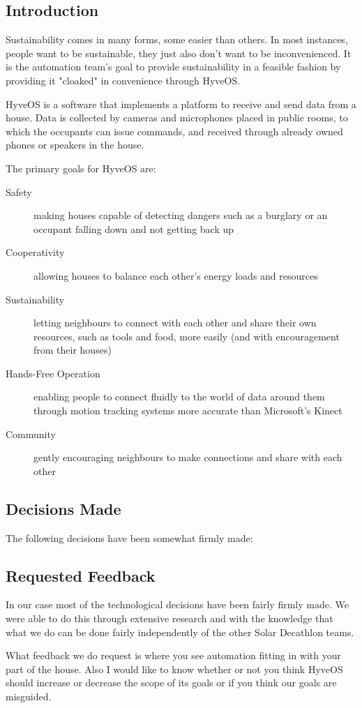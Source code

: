 \begin{multicols}{2}

\section{Introduction}

	Sustainability comes in many forms, some easier than others.
	In most instances, people want to be sustainable, they just also don't want to be inconvenienced.
	It is the automation team's goal to provide sustainability in a feasible fashion by providing it "cloaked" in convenience through HyveOS.
	
	HyveOS is a software that implements a platform to receive and send data from a house. 
	Data is collected by cameras and microphones placed in public rooms, to which the occupants can issue commands, and received through already owned phones or speakers in the house.
	
	The primary goals for HyveOS are:
	\begin{description}
		\item[Safety] making houses capable of detecting dangers such as a burglary or an occupant falling down and not getting back up
		\item[Cooperativity] allowing houses to balance each other's energy loads and resources
		\item[Sustainability] letting neighbours to connect with each other and share their own resources, such as tools and food, more easily (and with encouragement from their houses)
		\item[Hands-Free Operation] enabling people to connect fluidly to the world of data around them through motion tracking systems more accurate than Microsoft's Kinect
		\item[Community] gently encouraging neighbours to make connections and share with each other
	\end{description}

	\subsection{Decisions Made}
	
		The following decisions have been somewhat firmly made:
		
	\subsection{Requested Feedback}
	
		In our case most of the technological decisions have been fairly firmly made.
		We were able to do this through extensive research and with the knowledge that what we do can be done fairly independently of the other Solar Decathlon teams.
		
		What feedback we do request is where you see automation fitting in with your part of the house.
		Also I would like to know whether or not you think HyveOS should increase or decrease the scope of its goals or if you think our goals are misguided.


\end{multicols}
